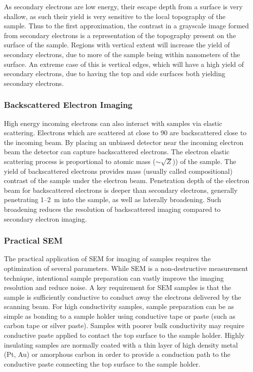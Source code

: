 As secondary electrons are low energy, their escape depth from a surface is very shallow, as such their yield is very sensitive to the local topography of the sample.
Thus to the first approximation, the contrast in a grayscale image formed from secondary electrons is a representation of the topography present on the surface of the sample.
Regions with vertical extent will increase the yield of secondary electrons, due to more of the sample being within nanometers of the surface.
An extreme case of this is vertical edges, which will have a high yield of secondary electrons, due to having the top and side surfaces both yielding secondary electrons.

\subsubsection{Backscattered Electron Imaging} High energy incoming electrons can also interact with samples via elastic scattering.
Electrons which are scattered at close to 90\degree{} are backscattered close to the incoming beam.
By placing an unbiased detector near the incoming electron beam the detector can capture backscattered electrons.
The electron elastic scattering process is proportional to atomic mass (\(\sim\)\(\sqrt{Z}\))) of the sample.
The yield of backscattered electrons provides mass (usually called compositional) contrast of the sample under the electron beam.
Penetration depth of the electron beam for backscattered electrons is deeper than secondary electrons, generally penetrating 1--2~\micro{}m into the sample, as well as laterally broadening.
Such broadening reduces the resolution of backscattered imaging compared to secondary electron imaging.

\subsubsection{Practical SEM} The practical application of SEM for imaging of samples requires the optimization of several parameters.
While SEM is a non-destructive measurement technique, intentional sample preparation can vastly improve the imaging resolution and reduce noise.
A key requirement for SEM samples is that the sample is sufficiently conductive to conduct away the electrons delivered by the scanning beam.
For high conductivity samples, sample preparation can be as simple as bonding to a sample holder using conductive tape or paste (such as carbon tape or silver paste).
Samples with poorer bulk conductivity may require conductive paste applied to contact the top surface to the sample holder.
Highly insulating samples are normally coated with a thin layer of high density metal (Pt, Au) or amorphous carbon in order to provide a conduction path to the conductive paste connecting the top surface to the sample holder.


